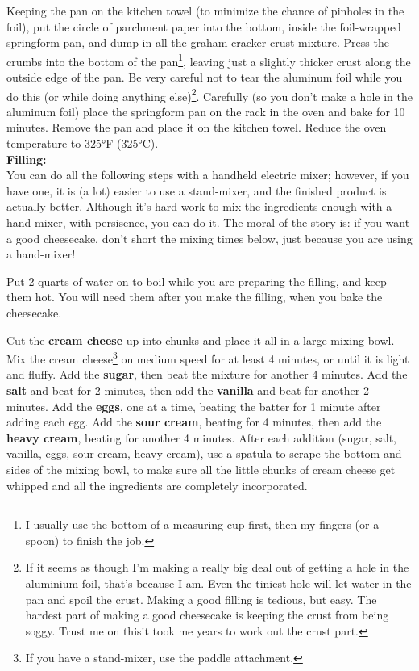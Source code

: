 Keeping the pan on the kitchen towel (to minimize the chance of pinholes in the foil), put the circle of parchment paper into the bottom, inside the foil-wrapped springform pan, and dump in all the graham cracker crust mixture. 
Press the crumbs into the bottom of the pan\footnote{I usually use the bottom of a measuring cup first, then my fingers (or a spoon) to finish the job.}, leaving just a slightly thicker crust along the outside edge of the pan. 
Be very careful not to tear the aluminum foil while you do this (or while doing anything else)\footnote{If it seems as though I’m making a really big deal out of getting a hole in the aluminium foil, that’s because I am. Even the tiniest hole will let water in the pan and spoil the crust. Making a good filling is tedious, but easy. The hardest part of making a good cheesecake is keeping the crust from being soggy. Trust me on this\textemdash it took me years to work out the crust part.}. 
Carefully (so you don’t make a hole in the aluminum foil) place the springform pan on the rack in the oven and bake for 10 minutes. 
Remove the pan and place it on the kitchen towel. Reduce the oven temperature to 325°F (325°C). \\ 

\noindent \textbf{Filling:} \\ 
You can do all the following steps with a handheld electric mixer; however, if you have one, it is (a lot) easier to use a stand-mixer, and the finished product is actually better. 
Although it’s hard work to mix the ingredients enough with a hand-mixer, with persisence, you can do it. 
The moral of the story is: if you want a good cheesecake, don’t short the mixing times below, just because you are using a hand-mixer! 

Put 2 quarts of water on to boil while you are preparing the filling, and keep them hot. 
You will need them after you make the filling, when you bake the cheesecake.

Cut the \textbf{cream cheese} up into chunks and place it all in a large mixing bowl. 
Mix the cream cheese\footnote{If you have a stand-mixer, use the paddle attachment.} on medium speed for at least 4 minutes, or until it is light and fluffy. 
Add the \textbf{sugar}, then beat the mixture for another 4 minutes. 
Add the \textbf{salt} and beat for 2 minutes, then add the \textbf{vanilla} and beat for another 2 minutes. 
Add the \textbf{eggs}, one at a time, beating the batter for 1 minute after adding each egg.
Add the \textbf{sour cream}, beating for 4 minutes, then add the \textbf{heavy cream}, beating for another 4 minutes. 
After each addition (sugar, salt, vanilla, eggs, sour cream, heavy cream), use a spatula to scrape the bottom and sides of the mixing bowl, to make sure all the little chunks of cream cheese get whipped and all the ingredients are completely incorporated. \\ 


